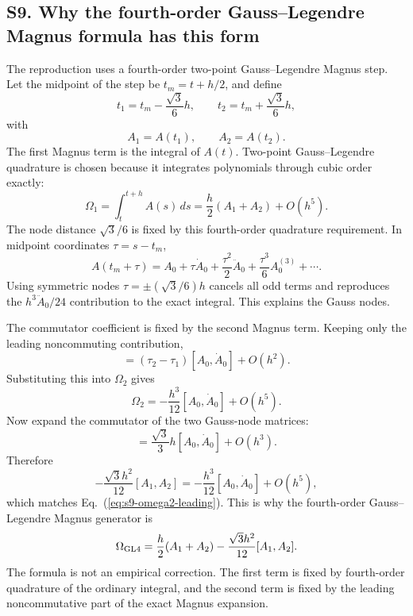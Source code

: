 \documentclass[aps,pra,preprint,superscriptaddress,nofootinbib]{revtex4-2}
\begin{document}
\subsection*{S9. Why the fourth-order Gauss--Legendre Magnus formula has this form}

The reproduction uses a fourth-order two-point Gauss--Legendre Magnus step. Let the midpoint of the step be \(t_m=t+h/2\), and define
\begin{equation}
t_1=t_m-\frac{\sqrt{3}}{6}h,\qquad
t_2=t_m+\frac{\sqrt{3}}{6}h,
\end{equation}
with
\begin{equation}
A_1=A(t_1),\qquad A_2=A(t_2).
\end{equation}
The first Magnus term is the integral of \(A(t)\). Two-point Gauss--Legendre quadrature is chosen because it integrates polynomials through cubic order exactly:
\begin{equation}
\Omega_1=\int_t^{t+h}A(s)\,ds
=\frac{h}{2}(A_1+A_2)+O(h^5).
\label{eq:s9-omega1}
\end{equation}
The node distance \(\sqrt{3}/6\) is fixed by this fourth-order quadrature requirement. In midpoint coordinates \(\tau=s-t_m\),
\begin{equation}
A(t_m+\tau)=A_0+\tau \dot A_0+\frac{\tau^2}{2}\ddot A_0+\frac{\tau^3}{6}A_0^{(3)}+\cdots.
\end{equation}
Using symmetric nodes \(\tau=\pm(\sqrt{3}/6)h\) cancels all odd terms and reproduces the \(h^3\ddot A_0/24\) contribution to the exact integral. This explains the Gauss nodes.

The commutator coefficient is fixed by the second Magnus term. Keeping only the leading noncommuting contribution,
\begin{equation}
[A(t_m+\tau_1),A(t_m+\tau_2)]
=(\tau_2-\tau_1)[A_0,\dot A_0]+O(h^2).
\end{equation}
Substituting this into \(\Omega_2\) gives
\begin{equation}
\Omega_2=-\frac{h^3}{12}[A_0,\dot A_0]+O(h^5).
\label{eq:s9-omega2-leading}
\end{equation}
Now expand the commutator of the two Gauss-node matrices:
\begin{equation}
[A_1,A_2]
=\frac{\sqrt{3}}{3}h[A_0,\dot A_0]+O(h^3).
\end{equation}
Therefore
\begin{equation}
-\frac{\sqrt{3}h^2}{12}[A_1,A_2]
=-\frac{h^3}{12}[A_0,\dot A_0]+O(h^5),
\end{equation}
which matches Eq.~(\ref{eq:s9-omega2-leading}). This is why the fourth-order Gauss--Legendre Magnus generator is
\begin{equation}
\Omega_{\rm GL4}
=\frac{h}{2}(A_1+A_2)
-\frac{\sqrt{3}h^2}{12}[A_1,A_2].
\label{eq:s9-magnus}
\end{equation}
The formula is not an empirical correction. The first term is fixed by fourth-order quadrature of the ordinary integral, and the second term is fixed by the leading noncommutative part of the exact Magnus expansion.
\end{document}
